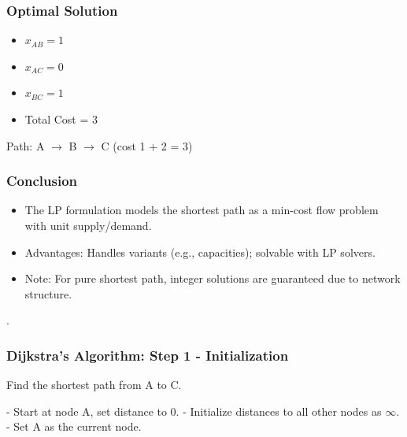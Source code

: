 \documentclass{beamer}
\begin{document}
\begin{frame}
\frametitle{Optimal Solution}
\begin{itemize}
  \item \(x_{AB} = 1\)
  \item \(x_{AC} = 0\)
  \item \(x_{BC} = 1\)
  \item Total Cost = 3
\end{itemize}

Path: A \(\rightarrow\) B \(\rightarrow\) C (cost 1 + 2 = 3)
\end{frame}

\begin{frame}
\frametitle{Conclusion}
\begin{itemize}
    \item The LP formulation models the shortest path as a min-cost flow problem with unit supply/demand.
    \item Advantages: Handles variants (e.g., capacities); solvable with LP solvers.
    \item Note: For pure shortest path, integer solutions are guaranteed due to network structure.
\end{itemize}.
\end{frame}

\begin{frame}
\frametitle{Dijkstra's Algorithm: Step 1 - Initialization}
Find the shortest path from A to C.

\begin{center}
\end{center}

- Start at node A, set distance to 0.
- Initialize distances to all other nodes as \(\infty\).
- Set A as the current node.
\end{frame}
\end{document}
